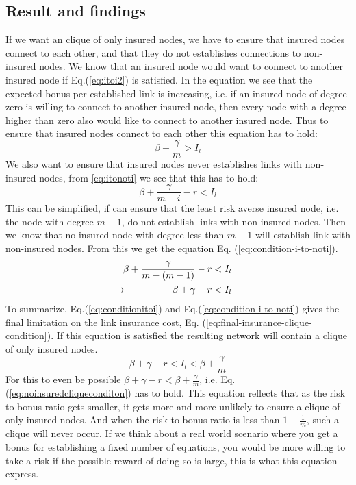 \subsection{Result and findings}

If we want an clique of only insured nodes, we have to ensure that insured nodes connect to each other, and that they do not establishes connections to non-insured nodes.
We know that an insured node would want to connect to another insured node if  Eq.(\ref{eq:itoi2}) is satisfied. 
In the equation we see that the expected bonus per established link is increasing, i.e. if an insured node of degree zero is willing to connect to another insured node, then every node with a degree higher than zero also would like to connect to another insured node. Thus to ensure that insured nodes connect to each other this equation has to hold:
\begin{equation}
\beta+\frac{\gamma}{m}>I_{l}
\label{eq:conditionitoi}
\end{equation}
We also want to ensure that insured nodes never establishes links with non-insured nodes, from \ref{eq:itonoti} we see that this has to hold:
\begin{equation}
\beta+\frac{\gamma}{m-i}-r < I_{l}
\label{eq:conditionitonoti}
\end{equation}
This can be simplified, if can ensure that the least risk averse insured node, i.e. the node with degree $m-1$, do not establish links with non-insured nodes. Then we know that no insured node with degree less than $m-1$ will establish link with non-insured nodes. From this we get the equation Eq. (\ref{eq:condition-i-to-noti}).
\begin{eqnarray}
\beta+\frac{\gamma}{m-(m-1)}-r&<I_{l} \nonumber\\
\llap{$\rightarrow$\hspace{50pt}} \beta+\gamma-r&<I_{l}
\label{eq:condition-i-to-noti}
\end{eqnarray}
To summarize, Eq.(\ref{eq:conditionitoi}) and Eq.(\ref{eq:condition-i-to-noti}) gives the final limitation on the link insurance cost, Eq. (\ref{eq:final-insurance-clique-condition}). If this equation is satisfied the resulting network will contain a clique of only insured nodes.
\begin{equation}
\beta+\gamma-r<I_{l}<\beta+\frac{\gamma}{m}
\label{eq:final-insurance-clique-condition}
\end{equation}
For this to even be possible $\beta+\gamma-r<\beta+\frac{\gamma}{m}$, i.e. Eq. (\ref{eq:noinsuredcliqueconditon}) has to hold. This equation reflects that as the risk to bonus ratio gets smaller, it gets more and more unlikely to ensure a clique of only insured nodes. And when the risk to bonus ratio is less than $1-\frac{1}{m}$, such a clique will never occur. If we think about a real world scenario where you get a bonus for establishing a fixed number of equations, you would be more willing to take a risk if the possible reward of doing so is large, this is what this equation express.
